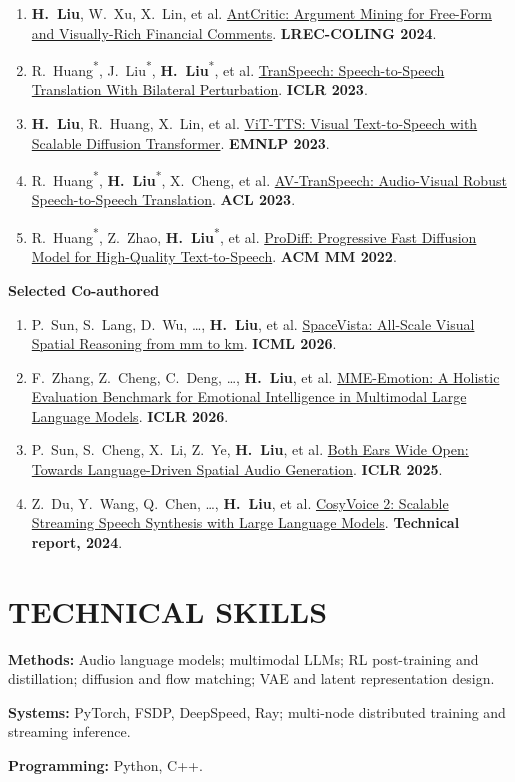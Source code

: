 \documentclass[10pt,letterpaper]{article}
\newcommand{\me}{\textbf{H.\ Liu}}
\newcommand{\eq}{\textsuperscript{*}}
\newcommand{\pub}[4]{\item #1. \href{#4}{\textcolor{ink}{#2}}. {\color{navy}\textbf{#3}}.}
\begin{document}
\begin{enumerate}[itemsep=1.5pt]
\pub{\me, W.\ Xu, X.\ Lin, et al}{AntCritic: Argument Mining for Free-Form and Visually-Rich Financial Comments}{LREC-COLING 2024}{https://aclanthology.org/2024.lrec-main.117/}
\pub{R.\ Huang\eq, J.\ Liu\eq, \me\eq, et al}{TranSpeech: Speech-to-Speech Translation With Bilateral Perturbation}{ICLR 2023}{https://arxiv.org/abs/2205.12523}
\pub{\me, R.\ Huang, X.\ Lin, et al}{ViT-TTS: Visual Text-to-Speech with Scalable Diffusion Transformer}{EMNLP 2023}{https://aclanthology.org/2023.emnlp-main.990/}
\pub{R.\ Huang\eq, \me\eq, X.\ Cheng, et al}{AV-TranSpeech: Audio-Visual Robust Speech-to-Speech Translation}{ACL 2023}{https://aclanthology.org/2023.acl-long.479/}
\pub{R.\ Huang\eq, Z.\ Zhao, \me\eq, et al}{ProDiff: Progressive Fast Diffusion Model for High-Quality Text-to-Speech}{ACM MM 2022}{https://doi.org/10.1145/3503161.3547855}
\end{enumerate}
\vspace{3pt}
{\fontsize{10.4}{12.6}\selectfont\textbf{Selected Co-authored}}\par
\begin{enumerate}[itemsep=1.5pt,resume]
\pub{P.\ Sun, S.\ Lang, D.\ Wu, \ldots, \me, et al}{SpaceVista: All-Scale Visual Spatial Reasoning from mm to km}{ICML 2026}{https://arxiv.org/abs/2510.09606}
\pub{F.\ Zhang, Z.\ Cheng, C.\ Deng, \ldots, \me, et al}{MME-Emotion: A Holistic Evaluation Benchmark for Emotional Intelligence in Multimodal Large Language Models}{ICLR 2026}{https://arxiv.org/abs/2508.09210}
\pub{P.\ Sun, S.\ Cheng, X.\ Li, Z.\ Ye, \me, et al}{Both Ears Wide Open: Towards Language-Driven Spatial Audio Generation}{ICLR 2025}{https://arxiv.org/abs/2410.10676}
\pub{Z.\ Du, Y.\ Wang, Q.\ Chen, \ldots, \me, et al}{CosyVoice 2: Scalable Streaming Speech Synthesis with Large Language Models}{Technical report, 2024}{https://arxiv.org/abs/2412.10117}
\end{enumerate}\endgroup

\section{TECHNICAL SKILLS}
\textbf{Methods:} Audio language models; multimodal LLMs; RL post-training and distillation; diffusion and flow matching; VAE and latent representation design.\par\vspace{2pt}
\textbf{Systems:} PyTorch, FSDP, DeepSpeed, Ray; multi-node distributed training and streaming inference.\par\vspace{2pt}
\textbf{Programming:} Python, C++.
\end{document}
